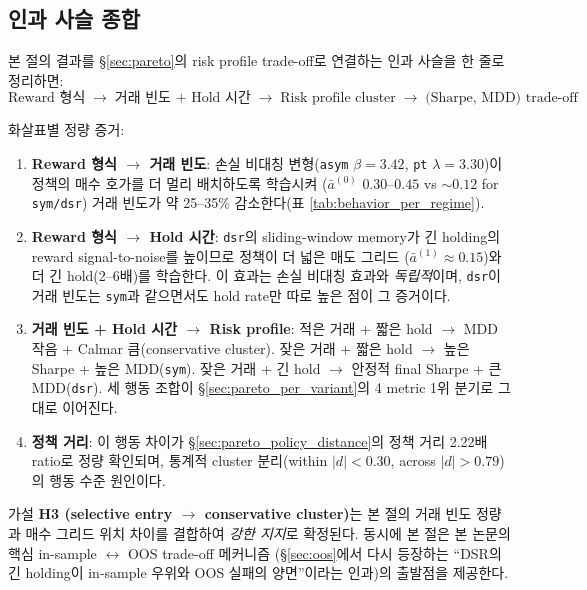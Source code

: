 \documentclass[11pt, a4paper]{article}
\begin{document}
\subsection{인과 사슬 종합}
\label{sec:mechanism_causal}

본 절의 결과를 \S\ref{sec:pareto}의 risk profile trade-off로 연결하는 인과 사슬을
한 줄로 정리하면:
\[
\boxed{
\text{Reward 형식}
\;\to\;
\text{거래 빈도 + Hold 시간}
\;\to\;
\text{Risk profile cluster}
\;\to\;
\text{(Sharpe, MDD) trade-off}
}
\]

화살표별 정량 증거:

\begin{enumerate}[leftmargin=*]
\item \textbf{Reward 형식 $\to$ 거래 빈도}: 손실 비대칭 변형(\texttt{asym} $\beta=3.42$,
\texttt{pt} $\lambda=3.30$)이 정책의 매수 호가를 더 멀리 배치하도록 학습시켜
($\bar{a}^{(0)}$ $0.30$--$0.45$ vs $\sim 0.12$ for \texttt{sym/dsr}) 거래 빈도가
약 25--35\% 감소한다(표 \ref{tab:behavior_per_regime}).
\item \textbf{Reward 형식 $\to$ Hold 시간}: \texttt{dsr}의 sliding-window memory가
긴 holding의 reward signal-to-noise를 높이므로 정책이 더 넓은 매도 그리드
($\bar{a}^{(1)} \approx 0.15$)와 더 긴 hold(2--6배)를 학습한다. 이 효과는 손실
비대칭 효과와 \emph{독립적}이며, \texttt{dsr}이 거래 빈도는 \texttt{sym}과 같으면서도
hold rate만 따로 높은 점이 그 증거이다.
\item \textbf{거래 빈도 + Hold 시간 $\to$ Risk profile}: 적은 거래 + 짧은 hold
$\to$ MDD 작음 + Calmar 큼(conservative cluster). 잦은 거래 + 짧은 hold $\to$
높은 Sharpe + 높은 MDD(\texttt{sym}). 잦은 거래 + 긴 hold $\to$ 안정적 final
Sharpe + 큰 MDD(\texttt{dsr}). 세 행동 조합이 \S\ref{sec:pareto_per_variant}의
4 metric 1위 분기로 그대로 이어진다.
\item \textbf{정책 거리}: 이 행동 차이가 \S\ref{sec:pareto_policy_distance}의
정책 거리 2.22배 ratio로 정량 확인되며, 통계적 cluster 분리(within $|d|<0.30$,
across $|d|>0.79$)의 행동 수준 원인이다.
\end{enumerate}

가설 \textbf{H3 (selective entry $\to$ conservative cluster)}는 본 절의 거래 빈도
정량과 매수 그리드 위치 차이를 결합하여 \emph{강한 지지}로 확정된다. 동시에 본
절은 본 논문의 핵심 in-sample $\leftrightarrow$ OOS trade-off 메커니즘
(\S\ref{sec:oos}에서 다시 등장하는 ``DSR의 긴 holding이 in-sample 우위와 OOS
실패의 양면''이라는 인과)의 출발점을 제공한다.

\end{document}
